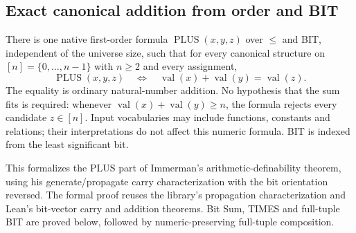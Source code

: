 \begin{result}
\subsection{Exact canonical addition from order and BIT}
There is one native first-order formula $\operatorname{PLUS}(x,y,z)$ over
$\le$ and BIT, independent of the universe size, such that for every canonical
structure on $[n]=\{0,\ldots,n-1\}$ with $n\ge2$ and every assignment,
\[
\operatorname{PLUS}(x,y,z)\quad\Longleftrightarrow\quad
\operatorname{val}(x)+\operatorname{val}(y)=\operatorname{val}(z).
\]
The equality is ordinary natural-number addition. No hypothesis that the sum
fits is required: whenever $\operatorname{val}(x)+\operatorname{val}(y)\ge n$,
the formula rejects every candidate $z\in[n]$. Input vocabularies may include
functions, constants and relations; their interpretations do not affect this
numeric formula. BIT is indexed from the least significant bit.

This formalizes the PLUS part of Immerman's arithmetic-definability theorem,
using his generate/propagate carry characterization with the bit orientation
reversed.\citep[Proposition 1.9 and Theorem 1.17(1)]{Immerman1999}
The formal proof reuses the library's propagation characterization and Lean's
bit-vector carry and addition theorems. Bit Sum, TIMES and full-tuple BIT are
proved below, followed by numeric-preserving full-tuple composition.
\end{result}

